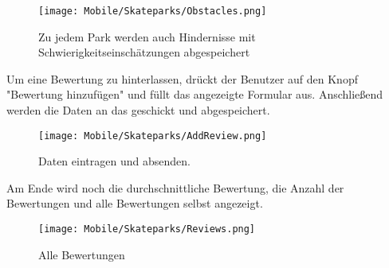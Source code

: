 \begin{figure}[H]
  \begin{center}
    \texttt{[image: Mobile/Skateparks/Obstacles.png]}
    \caption{Zu jedem Park werden auch Hindernisse mit Schwierigkeitseinschätzungen abgespeichert}
  \end{center}
\end{figure}

Um eine Bewertung zu hinterlassen, drückt der Benutzer auf den Knopf "Bewertung hinzufügen"{ }und
füllt das angezeigte Formular aus. Anschließend werden die Daten an das  geschickt
und abgespeichert.

\begin{figure}[H]
  \begin{center}
    \texttt{[image: Mobile/Skateparks/AddReview.png]}
    \caption{Daten eintragen und absenden.}
  \end{center}
\end{figure}

Am Ende wird noch die durchschnittliche Bewertung, die Anzahl der Bewertungen und alle Bewertungen
selbst angezeigt.

\begin{figure}[H]
  \begin{center}
    \texttt{[image: Mobile/Skateparks/Reviews.png]}
    \caption{Alle Bewertungen}
  \end{center}
\end{figure}
